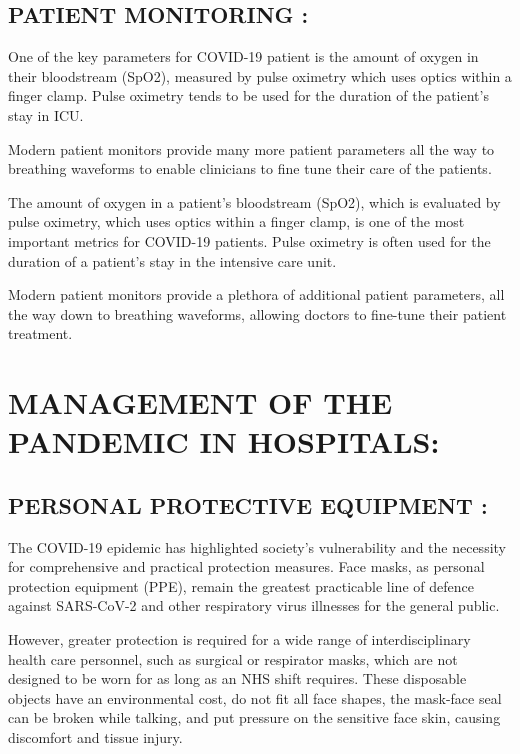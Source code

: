 \documentclass[12pt]{article}
\begin{document}
\subsection{PATIENT MONITORING :}

One of the key parameters for COVID-19 patient is the amount of oxygen in their bloodstream (SpO2), measured by pulse oximetry which uses optics within a finger clamp. Pulse oximetry tends to be used for the duration of the patient’s stay in ICU.

Modern patient monitors provide many more patient parameters all the way to breathing waveforms to enable clinicians to fine tune their care of the patients.


The amount of oxygen in a patient's bloodstream (SpO2), which is evaluated by pulse oximetry, which uses optics within a finger clamp, is one of the most important metrics for COVID-19 patients. Pulse oximetry is often used for the duration of a patient's stay in the intensive care unit.

Modern patient monitors provide a plethora of additional patient parameters, all the way down to breathing waveforms, allowing doctors to fine-tune their patient treatment.


\section{MANAGEMENT OF THE PANDEMIC IN HOSPITALS:}


\subsection{PERSONAL PROTECTIVE EQUIPMENT :}
 
 
 The COVID-19 epidemic has highlighted society's vulnerability and the necessity for comprehensive and practical protection measures. Face masks, as personal protection equipment (PPE), remain the greatest practicable line of defence against SARS-CoV-2 and other respiratory virus illnesses for the general public.
 
 
 
 However, greater protection is required for a wide range of interdisciplinary health care personnel, such as surgical or respirator masks, which are not designed to be worn for as long as an NHS shift requires. These disposable objects have an environmental cost, do not fit all face shapes, the mask-face seal can be broken while talking, and put pressure on the sensitive face skin, causing discomfort and tissue injury.
 
\end{document}
